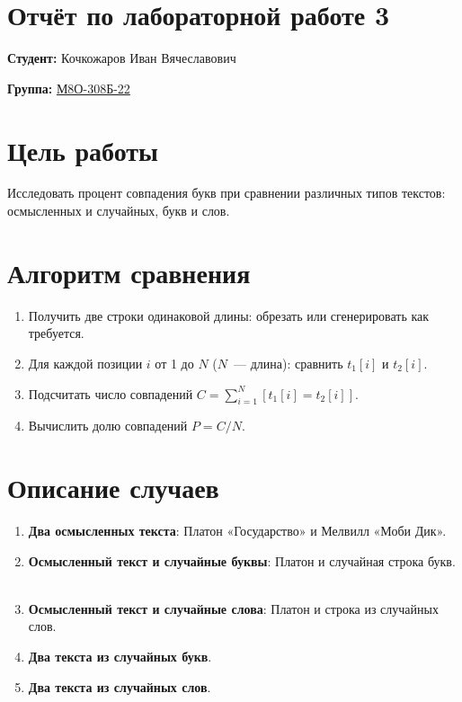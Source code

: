 \documentclass[a4paper,12pt]{article}
\begin{document}
\section*{Отчёт по лабораторной работе 3}

\bigskip

\textbf{Студент:} Кочкожаров Иван Вячеславович

\noindent
\textbf{Группа:} \underline{М8О-308Б-22}

\bigskip

\section{Цель работы}
Исследовать процент совпадения букв при сравнении различных типов текстов: осмысленных и случайных, букв и слов.

\section{Алгоритм сравнения}
\begin{enumerate}
\item Получить две строки одинаковой длины: обрезать или сгенерировать как требуется.
\item Для каждой позиции $i$ от 1 до $N$ ($N$~--- длина): сравнить $t_1[i]$ и $t_2[i]$.
\item Подсчитать число совпадений $C = \sum_{i=1}^N [t_1[i] = t_2[i]]$.
\item Вычислить долю совпадений $P = C / N$.
\end{enumerate}

\section{Описание случаев}
\begin{enumerate}
\item \textbf{Два осмысленных текста}: Платон «Государство» и Мелвилл «Моби Дик». \
\item \textbf{Осмысленный текст и случайные буквы}: Платон и случайная строка букв. \
\item \textbf{Осмысленный текст и случайные слова}: Платон и строка из случайных слов. \
\item \textbf{Два текста из случайных букв}. \
\item \textbf{Два текста из случайных слов}.
\end{enumerate}
\end{document}

